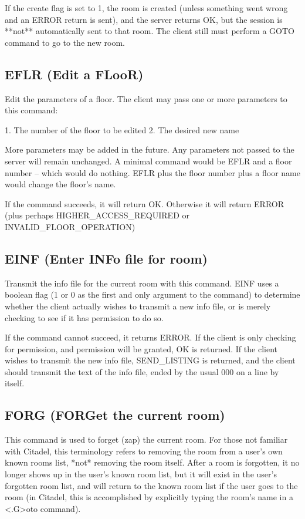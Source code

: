  If the create flag is set to 1, the room is created (unless something
went wrong and an ERROR return is sent), and the server returns OK, but
the session is **not** automatically sent to that room.  The client still
must perform a GOTO command to go to the new room.



\subsection{EFLR (Edit a FLooR)}

 Edit the parameters of a floor.  The client may pass one or more parameters
to this command:

 1. The number of the floor to be edited
 2. The desired new name

 More parameters may be added in the future.  Any parameters not passed to
the server will remain unchanged.  A minimal command would be EFLR and a
floor number -- which would do nothing.  EFLR plus the floor number plus a
floor name would change the floor's name.

 If the command succeeds, it will return OK.  Otherwise it will return
ERROR (plus perhaps HIGHER_ACCESS_REQUIRED or INVALID_FLOOR_OPERATION)



\subsection{EINF (Enter INFo file for room)}

 Transmit the info file for the current room with this command.  EINF uses
a boolean flag (1 or 0 as the first and only argument to the command) to
determine whether the client actually wishes to transmit a new info file, or
is merely checking to see if it has permission to do so.

 If the command cannot succeed, it returns ERROR.
 If the client is only checking for permission, and permission will be
granted, OK is returned.
 If the client wishes to transmit the new info file, SEND_LISTING is
returned, and the client should transmit the text of the info file, ended
by the usual 000 on a line by itself.



\subsection{FORG (FORGet the current room)}

 This command is used to forget (zap) the current room.  For those not
familiar with Citadel, this terminology refers to removing the room from
a user's own known rooms list, *not* removing the room itself.  After a
room is forgotten, it no longer shows up in the user's known room list,
but it will exist in the user's forgotten room list, and will return to the
known room list if the user goes to the room (in Citadel, this is
accomplished by explicitly typing the room's name in a <.G>oto command).

